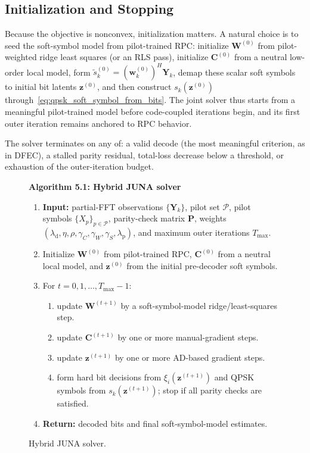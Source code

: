 \documentclass{wileysev}
\begin{document}
	\subsection{Initialization and Stopping}
	
	Because the objective is nonconvex, initialization matters. A natural choice is to seed the soft-symbol model from pilot-trained RPC: initialize \(\mathbf{W}^{(0)}\) from pilot-weighted ridge least squares (or an RLS pass), initialize \(\mathbf{C}^{(0)}\) from a neutral low-order local model, form \(\widetilde{s}_k^{(0)}=(\mathbf w_k^{(0)})^{H}\mathbf Y_k\), demap these scalar soft symbols to initial bit latents \(\mathbf z^{(0)}\), and then construct \(s_k(\mathbf z^{(0)})\) through~\eqref{eq:qpsk_soft_symbol_from_bits}. The joint solver thus starts from a meaningful pilot-trained model before code-coupled iterations begin, and its first outer iteration remains anchored to RPC behavior.
	
	The solver terminates on any of: a valid decode (the most meaningful criterion, as in DFEC), a stalled parity residual, total-loss decrease below a threshold, or exhaustion of the outer-iteration budget.
	
	\begin{figure}[tbp]
		\centering
		\begin{minipage}{0.9\textwidth}
			\small
			\textbf{Algorithm 5.1: Hybrid JUNA solver}
			
			\begin{enumerate}
				\item \textbf{Input:} partial-FFT observations \(\{\mathbf{Y}_k\}\), pilot set \(\mathcal{P}\), pilot symbols \(\{X_p\}_{p\in\mathcal{P}}\), parity-check matrix \(\mathbf{P}\), weights \((\lambda_{\mathrm d},\eta,\rho,\gamma_C,\gamma_W,\gamma_S,\lambda_{\mathrm p})\), and maximum outer iterations \(T_{\max}\).
				\item Initialize \(\mathbf{W}^{(0)}\) from pilot-trained RPC, \(\mathbf{C}^{(0)}\) from a neutral local model, and \(\mathbf{z}^{(0)}\) from the initial pre-decoder soft symbols.
				\item For \(t=0,1,\dots,T_{\max}-1\):
				\begin{enumerate}
					\item update \(\mathbf{W}^{(t+1)}\) by a soft-symbol-model ridge/least-squares step.
					\item update \(\mathbf{C}^{(t+1)}\) by one or more manual-gradient steps.
					\item update \(\mathbf{z}^{(t+1)}\) by one or more AD-based gradient steps.
					\item form hard bit decisions from \(\xi_i(\mathbf z^{(t+1)})\) and QPSK symbols from \(s_k(\mathbf z^{(t+1)})\); stop if all parity checks are satisfied.
				\end{enumerate}
				\item \textbf{Return:} decoded bits and final soft-symbol-model estimates.
			\end{enumerate}
		\end{minipage}
		\caption{Hybrid JUNA solver.}
		\label{fig:juna_algorithm}
	\end{figure}
\end{document}
